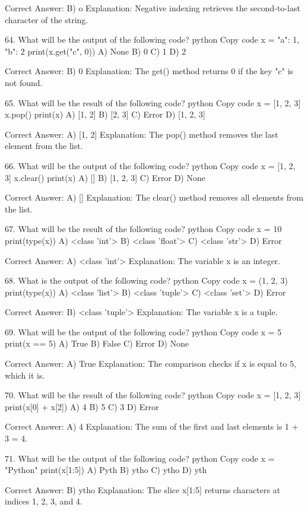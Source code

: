 Correct Answer: B) o
Explanation: Negative indexing retrieves the second-to-last character of the string.

64. What will be the output of the following code?
python
Copy code
x = {"a": 1, "b": 2}
print(x.get("c", 0))
A) None
B) 0
C) 1
D) 2

Correct Answer: B) 0
Explanation: The get() method returns 0 if the key "c" is not found.

65. What will be the result of the following code?
python
Copy code
x = [1, 2, 3]
x.pop()
print(x)
A) [1, 2]
B) [2, 3]
C) Error
D) [1, 2, 3]

Correct Answer: A) [1, 2]
Explanation: The pop() method removes the last element from the list.

66. What will be the output of the following code?
python
Copy code
x = [1, 2, 3]
x.clear()
print(x)
A) []
B) [1, 2, 3]
C) Error
D) None

Correct Answer: A) []
Explanation: The clear() method removes all elements from the list.

67. What will be the result of the following code?
python
Copy code
x = 10
print(type(x))
A) <class 'int'>
B) <class 'float'>
C) <class 'str'>
D) Error

Correct Answer: A) <class 'int'>
Explanation: The variable x is an integer.

68. What is the output of the following code?
python
Copy code
x = (1, 2, 3)
print(type(x))
A) <class 'list'>
B) <class 'tuple'>
C) <class 'set'>
D) Error

Correct Answer: B) <class 'tuple'>
Explanation: The variable x is a tuple.

69. What will be the output of the following code?
python
Copy code
x = 5
print(x == 5)
A) True
B) False
C) Error
D) None

Correct Answer: A) True
Explanation: The comparison checks if x is equal to 5, which it is.

70. What will be the result of the following code?
python
Copy code
x = [1, 2, 3]
print(x[0] + x[2])
A) 4
B) 5
C) 3
D) Error

Correct Answer: A) 4
Explanation: The sum of the first and last elements is 1 + 3 = 4.

71. What will be the output of the following code?
python
Copy code
x = "Python"
print(x[1:5])
A) Pyth
B) ytho
C) ytho
D) yth

Correct Answer: B) ytho
Explanation: The slice x[1:5] returns characters at indices 1, 2, 3, and 4.

